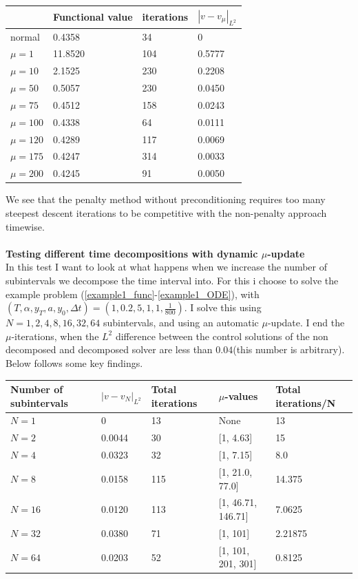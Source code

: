 \documentclass[11pt,a4paper]{article}
\begin{document}
 \begin{center}
    \begin{tabular}{| l | l | l | l |}
    \hline
     & Functional value &iterations  & $|v-v_{\mu}|_{L^2}$   \\ \hline
    normal &0.4358 & 34& 0 	\\ \hline
    $\mu=1$ & 11.8520& 104&0.5777	\\ \hline
    $\mu=10$ &2.1525 &230& 0.2208	\\ \hline
    $\mu=50$ &0.5057&230& 0.0450	\\ \hline
    $\mu=75$ &0.4512 &158& 0.0243\\ \hline
    $\mu=100$ &0.4338&64&0.0111	\\ \hline
    $\mu=120$ &0.4289&117&0.0069\\ \hline
    $\mu=175$ &0.4247&314&0.0033\\ \hline
    $\mu=200$ &0.4245&91&0.0050\\ \hline
    \end{tabular}
\end{center}
We see that the penalty method without preconditioning requires too many steepest descent iterations to be competitive with the non-penalty approach timewise. 
\\
\\
\textbf{Testing different time decompositions with dynamic $\mu$-update}
\\
In this test I want to look at what happens when we increase the number of subintervals we decompose the time interval into. For this i choose to solve the example problem (\ref{example1_func}-\ref{example1_ODE}), with $(T,\alpha,y_T,a,y_0,\Delta t)=(1,0.2,5,1,1,\frac{1}{800})$. I solve this using $N=1,2,4,8,16,32,64$ subintervals, and using an automatic $\mu$-update. I end the $\mu$-iterations, when the $L^2$ difference between the control solutions of the non decomposed and decomposed solver are less than $0.04$(this number is arbitrary). Below follows some key findings.
 \begin{center}
    \begin{tabular}{| l | l | l | l | l |}
    \hline
     Number of subintervals & $|v-v_{N}|_{L^2}$ & Total iterations & $\mu$-values &  Total iterations/N  \\ \hline
    $N=1$ & 0 &13 & None	&13\\ \hline
    $N=2$& 0.0044 &30 &[1, 4.63] 	&15\\ \hline
    $N=4$ & 0.0323 &32 &[1, 7.15]&8.0\\ \hline
    $N=8$ & 0.0158 & 115& [1, 21.0, 77.0]	&14.375\\ \hline
    $N=16$ & 0.0120 &113 & [1, 46.71, 146.71]&7.0625	\\ \hline
    $N=32$ & 0.0380 &71 & [1, 101]&2.21875\\ \hline
    $N=64$ & 0.0203 & 52& [1, 101, 201, 301]	&0.8125\\ \hline
    \end{tabular}
\end{center}
\end{document}
